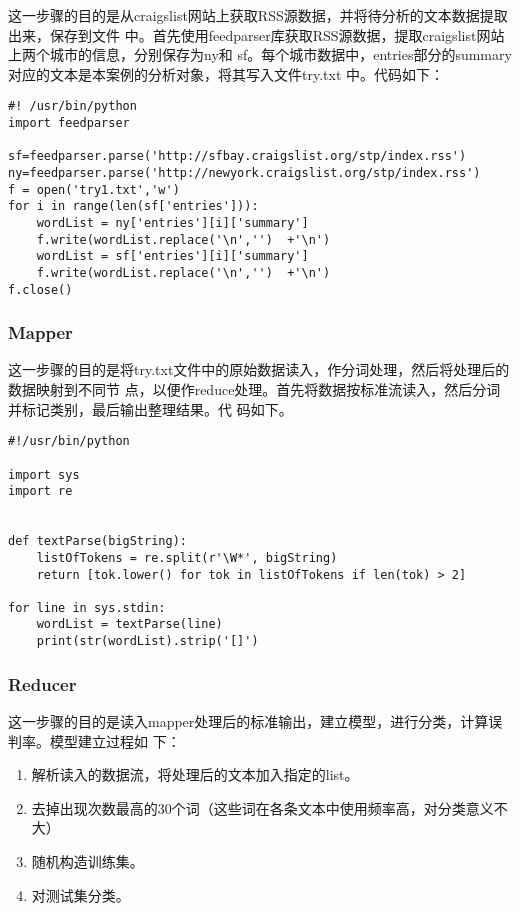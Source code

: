 这一步骤的目的是从craigslist网站上获取RSS源数据，并将待分析的文本数据提取出来，保存到文件
中。首先使用feedparser库获取RSS源数据，提取craigslist网站上两个城市的信息，分别保存为ny和
sf。每个城市数据中，entries部分的summary对应的文本是本案例的分析对象，将其写入文件try.txt
中。代码如下：

\begin{lstlisting}
#! /usr/bin/python
import feedparser

sf=feedparser.parse('http://sfbay.craigslist.org/stp/index.rss')
ny=feedparser.parse('http://newyork.craigslist.org/stp/index.rss')
f = open('try1.txt','w')
for i in range(len(sf['entries'])):
    wordList = ny['entries'][i]['summary']
    f.write(wordList.replace('\n','')  +'\n')
    wordList = sf['entries'][i]['summary']
    f.write(wordList.replace('\n','')  +'\n')
f.close()
\end{lstlisting}

\subsubsection{Mapper}\label{mapper}

这一步骤的目的是将try.txt文件中的原始数据读入，作分词处理，然后将处理后的数据映射到不同节
点，以便作reduce处理。首先将数据按标准流读入，然后分词并标记类别，最后输出整理结果。代
码如下。

\begin{lstlisting}
#!/usr/bin/python

import sys
import re


def textParse(bigString):
    listOfTokens = re.split(r'\W*', bigString)
    return [tok.lower() for tok in listOfTokens if len(tok) > 2]

for line in sys.stdin:
    wordList = textParse(line)
    print(str(wordList).strip('[]')
\end{lstlisting}

\subsubsection{Reducer}\label{reducer}

这一步骤的目的是读入mapper处理后的标准输出，建立模型，进行分类，计算误判率。模型建立过程如
下：

\begin{enumerate}
\def\labelenumi{\arabic{enumi}.}
\itemsep1pt\parskip0pt
\item
  解析读入的数据流，将处理后的文本加入指定的list。
\item
  去掉出现次数最高的30个词（这些词在各条文本中使用频率高，对分类意义不大）
\item
  随机构造训练集。
\item
  对测试集分类。
\end{enumerate}

